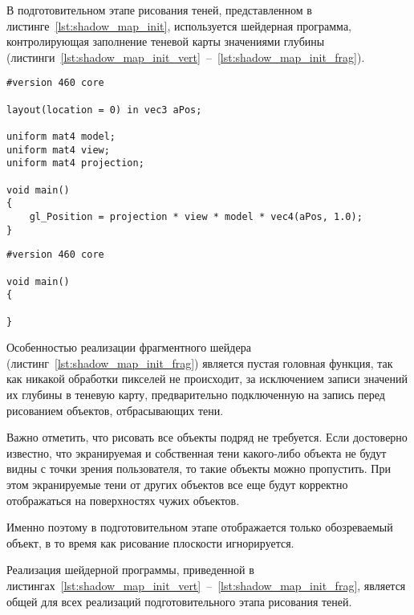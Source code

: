 В подготовительном этапе рисования теней, представленном в листинге~\ref{lst:shadow_map_init},
используется шейдерная программа, контролирующая заполнение теневой карты значениями глубины
(\hbox{листинги~\ref{lst:shadow_map_init_vert}~--~\ref{lst:shadow_map_init_frag}}).

\begin{center}
\captionsetup{justification=centering, singlelinecheck=off}
\begin{lstlisting}[label=lst:shadow_map_init_vert, caption=Вершинный шейдер заполнения теневой карты]
#version 460 core

layout(location = 0) in vec3 aPos;

uniform mat4 model;
uniform mat4 view;
uniform mat4 projection;

void main()
{
    gl_Position = projection * view * model * vec4(aPos, 1.0);
}
\end{lstlisting}
\end{center}

\begin{center}
\captionsetup{justification=centering, singlelinecheck=off}
\begin{lstlisting}[label=lst:shadow_map_init_frag, caption=Фрагментный шейдер заполнения теневой карты]
#version 460 core

void main()
{

}
\end{lstlisting}
\end{center}

Особенностью реализации фрагментного шейдера (листинг~\ref{lst:shadow_map_init_frag})
является пустая головная функция, так как никакой обработки пикселей не происходит,
за исключением записи значений их глубины в теневую карту, предварительно
подключенную на запись перед рисованием объектов, отбрасывающих тени.

Важно отметить, что рисовать все объекты подряд не требуется. Если достоверно известно,
что экранируемая и собственная тени какого-либо объекта не будут видны с точки зрения пользователя,
то такие объекты можно пропустить. При этом экранируемые тени от других объектов все еще будут корректно
отображаться на поверхностях чужих объектов.

Именно поэтому в подготовительном этапе отображается только обозреваемый объект, в то время как
рисование плоскости игнорируется.

Реализация шейдерной программы, приведенной в
листингах~\ref{lst:shadow_map_init_vert}~--~\ref{lst:shadow_map_init_frag},
является общей для всех реализаций подготовительного этапа рисования теней.

